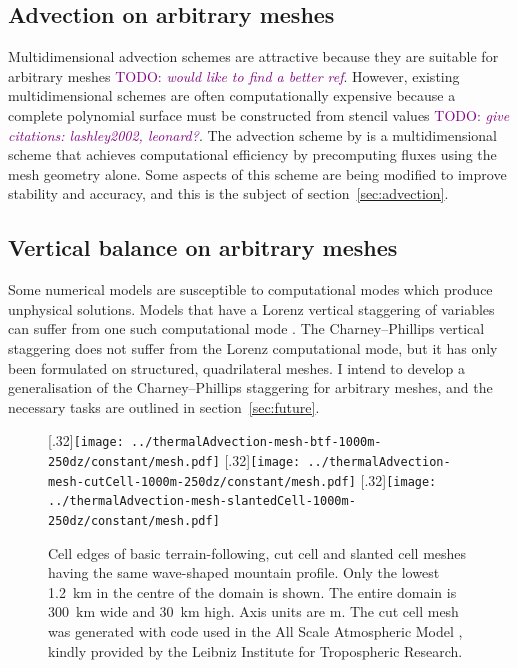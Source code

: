\documentclass[a4paper,11pt]{article}
\newcommand{\TODO}[1]{\textcolor{purple}{TODO: \emph{#1}}}
\begin{document}
\subsection*{Advection on arbitrary meshes}
Multidimensional advection schemes are attractive because they are suitable for arbitrary meshes \citep{dubey2014} \TODO{would like to find a better ref}.  However, existing multidimensional schemes are often computationally expensive because a complete polynomial surface must be constructed from stencil values \TODO{give citations: lashley2002, leonard?}.
The advection scheme by \citet{weller-shahrokhi2014} is a multidimensional scheme that achieves computational efficiency by precomputing fluxes using the mesh geometry alone.  Some aspects of this scheme are being modified to improve stability and accuracy, and this is the subject of section~\ref{sec:advection}.

\subsection*{Vertical balance on arbitrary meshes}
Some numerical models are susceptible to computational modes which produce unphysical solutions.   Models that have a Lorenz vertical staggering of variables can suffer from one such computational mode \citep{arakawa-konor1996}.  The Charney--Phillips vertical staggering does not suffer from the Lorenz computational mode, but it has only been formulated on structured, quadrilateral meshes.  I intend to develop a generalisation of the Charney--Phillips staggering for arbitrary meshes, and the necessary tasks are outlined in section~\ref{sec:future}.

\begin{figure}
	\centering
	[.32\linewidth]{\texttt{[image: ../thermalAdvection-mesh-btf-1000m-250dz/constant/mesh.pdf]}}
	[.32\linewidth]{\texttt{[image: ../thermalAdvection-mesh-cutCell-1000m-250dz/constant/mesh.pdf]}}
	[.32\linewidth]{\texttt{[image: ../thermalAdvection-mesh-slantedCell-1000m-250dz/constant/mesh.pdf]}}
	\caption{Cell edges of basic terrain-following, cut cell and slanted cell meshes having the same wave-shaped mountain profile.  Only the lowest \SI{1.2}{\kilo\meter} in the centre of the domain is shown.  The entire domain is \SI{300}{\kilo\meter} wide and \SI{30}{\kilo\meter} high.  Axis units are \si{\meter}.
The cut cell mesh was generated with code used in the All Scale Atmospheric Model \citep{jaehn2015}, kindly provided by the Leibniz Institute for Tropospheric Research.}
	\label{fig:meshes}
\end{figure}
\end{document}
